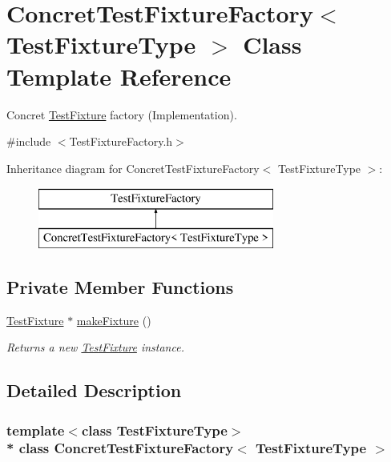 \hypertarget{class_concret_test_fixture_factory}{}\section{Concret\+Test\+Fixture\+Factory$<$ Test\+Fixture\+Type $>$ Class Template Reference}
\label{class_concret_test_fixture_factory}


Concret \hyperlink{class_test_fixture}{Test\+Fixture} factory (Implementation).  




{\ttfamily \#include $<$Test\+Fixture\+Factory.\+h$>$}

Inheritance diagram for Concret\+Test\+Fixture\+Factory$<$ Test\+Fixture\+Type $>$\+:\begin{figure}[H]
\begin{center}
\leavevmode
\includegraphics[height=2.000000cm]{class_concret_test_fixture_factory}
\end{center}
\end{figure}
\subsection*{Private Member Functions}
\begin{DoxyCompactItemize}
\item 
\hyperlink{class_test_fixture}{Test\+Fixture} $\ast$ \hyperlink{class_concret_test_fixture_factory_abac25800871b48edbd34778e2c6b55ed}{make\+Fixture} ()
\begin{DoxyCompactList}\small\item\em Returns a new \hyperlink{class_test_fixture}{Test\+Fixture} instance. \end{DoxyCompactList}\end{DoxyCompactItemize}


\subsection{Detailed Description}
\subsubsection*{template$<$class Test\+Fixture\+Type$>$\\*
class Concret\+Test\+Fixture\+Factory$<$ Test\+Fixture\+Type $>$}

